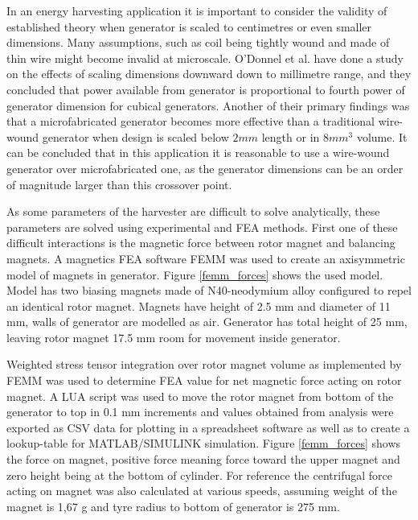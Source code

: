 In an energy harvesting application it is important to consider the validity of established theory when generator is scaled to centimetres or even smaller dimensions. Many assumptions, such as coil being tightly wound and made of thin wire might become invalid at microscale. O'Donnel et al. \cite{ODonnell2007} have done a study on the effects of scaling dimensions downward down to millimetre range, and they concluded that power available from generator is proportional to fourth power of generator dimension for cubical generators. Another of their primary findings was that a microfabricated generator becomes more effective than a traditional wire-wound generator when design is scaled below $2 mm$ length or in $8 mm^3$ volume. It can be concluded that in this application it is reasonable to use a wire-wound generator over microfabricated one, as the generator dimensions can be an order of magnitude larger than this crossover point. 

As some parameters of the harvester are difficult to solve analytically, these parameters are solved using experimental and FEA methods. First one of these difficult interactions is the magnetic force between rotor magnet and balancing magnets. A magnetics FEA software FEMM \cite{Meeker2013} was used to create an axisymmetric model of magnets in generator. Figure \ref{femm_forces} shows the used model. Model has two biasing magnets made of N40-neodymium alloy configured to repel an identical rotor magnet. Magnets have height of 2.5 mm and diameter of 11 mm, walls of generator are modelled as air. Generator has total height of 25 mm, leaving rotor magnet 17.5 mm room for movement inside generator.

Weighted stress tensor integration over rotor magnet volume as implemented by FEMM was used to determine FEA value for net magnetic force acting on rotor magnet. A LUA script was used to move the rotor magnet from bottom of the generator to top in 0.1 mm increments and values obtained from analysis were exported as CSV data for plotting in a spreadsheet software as well as to create a lookup-table for MATLAB/SIMULINK simulation. Figure \ref{femm_forces} shows the force on magnet, positive force meaning force toward the upper magnet and zero height being at the bottom of cylinder. For reference the centrifugal force acting on magnet was also calculated at various speeds, assuming weight of the magnet is 1,67 g and tyre radius to bottom of generator is 275 mm.

